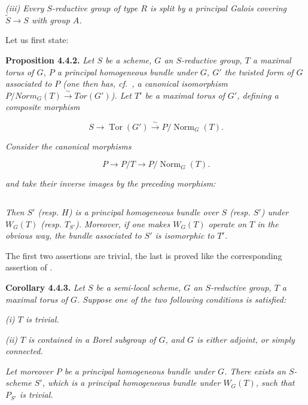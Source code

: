 \emph{(iii) Every \(S\)-reductive group of type \(R\) is split by a principal Galois covering \(\tilde{S} \to S\) with group \(A\).}

Let us first state:

\textbf{Proposition 4.4.2.} \emph{Let \(S\) be a scheme, \(G\) an \(S\)-reductive group, \(T\) a maximal torus of \(G\), \(P\) a principal
homogeneous bundle under \(G\), \(G'\) the twisted form of \(G\) associated to \(P\) (one then has, cf.~, a canonical
isomorphism \(P / Norm_{G}(T) \xrightarrow{\sim} Tor(G')\)). Let \(T'\) be a maximal torus of \(G'\), defining a composite
morphism}

\[
  S\longrightarrow\operatorname{Tor}(G')
  \xrightarrow{\sim}P/\operatorname{Norm}_G(T).
\]

\emph{Consider the canonical morphisms}

\[
  P\longrightarrow P/T\longrightarrow P/\operatorname{Norm}_G(T).
\]

\emph{and take their inverse images by the preceding morphism:}

\[
  
\]

\emph{Then \(S'\) (resp. \(H\)) is a principal homogeneous bundle over \(S\) (resp. \(S'\)) under \(W_{G}(T)\) (resp. \(T_{S'}\)).
Moreover, if one makes \(W_{G}(T)\) operate on \(T\) in the obvious way, the bundle associated to \(S'\) is isomorphic to
\(T'\).}

The first two assertions are trivial, the last is proved like the corresponding assertion of .

\textbf{Corollary 4.4.3.} \emph{Let \(S\) be a semi-local scheme, \(G\) an \(S\)-reductive group, \(T\) a maximal torus of \(G\). Suppose
one of the two following conditions is satisfied:}

\emph{(i) \(T\) is trivial.}

\emph{(ii) \(T\) is contained in a Borel subgroup of \(G\), and \(G\) is either adjoint, or simply connected.}

\emph{Let moreover \(P\) be a principal homogeneous bundle under \(G\). There exists an \(S\)-scheme \(S'\), which is a principal
homogeneous bundle under \(W_{G}(T)\), such that \(P_{S'}\) is trivial.}

